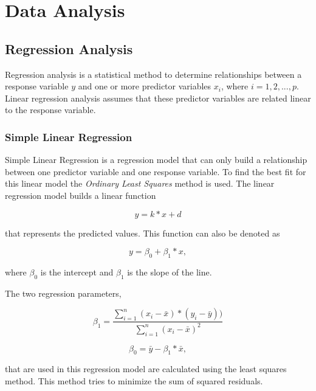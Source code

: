 \chapter{Data Analysis}
\label{ch:dataanalysis}

\author{Nico Kratky}
%
\section {Regression Analysis}

Regression analysis is a statistical method to determine relationships between a response variable $ y $ and one or more predictor variables $ x_i $, where $ i = 1, 2, ..., p $. Linear regression analysis assumes that these predictor variables are related linear to the response variable.

\subsection{Simple Linear Regression}
\label{sec:slr}

Simple Linear Regression is a regression model that can only build a relationship between one predictor variable and one response variable. To find the best fit for this linear model the \textit{Ordinary Least Squares} method is used. The linear regression model builds a linear function

\begin{equation}
\label{eq:line}
    y = k * x + d
\end{equation}

that represents the predicted values. This function can also be denoted as

\begin{equation}
\label{eq:slr}
    y = \beta_0 + \beta_1 * x,
\end{equation}

where $ \beta_0 $ is the intercept and $ \beta_1 $ is the slope of the line.

The two regression parameters,

\begin{equation}
    \beta_1 = \frac{\sum_{i=1}^{n} (x_i - \bar{x}) * (y_i - \bar{y}))}{\sum_{i=1}^{n} (x_i - \bar{x})^2}
\end{equation}

\begin{equation}
    \beta_0 = \bar{y} - \beta_1 * \bar{x},
\end{equation}

that are used in this regression model are calculated using the least squares method. This method tries to minimize the sum of squared residuals.

